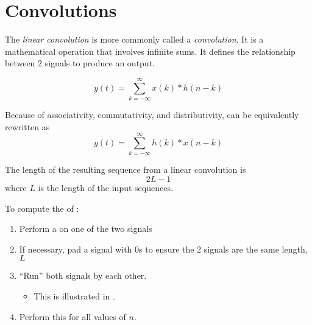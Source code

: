 \section{Convolutions}\label{sec:Convolutions}
\begin{definition}\label{def:Linear_Convolution}
  The \emph{linear convolution} is more commonly called a \emph{convolution}.
  It is a mathematical operation that involves infinite sums.
  It defines the relationship between 2 signals to produce an output.

  \begin{equation}\label{eq:Linear_Convolution-1}
    y(t) = \sum\limits_{k=-\infty}^{\infty} x(k) * h(n-k)
  \end{equation}

  Because of associativity, commutativity, and distributivity,  can be equivalently rewritten as
  \begin{equation}\label{eq:Linear_Convolution-2}
    y(t) = \sum\limits_{k=-\infty}^{\infty} h(k) * x(n-k)
  \end{equation}

  The length of the resulting sequence from a linear convolution is
  \begin{equation}\label{eq:Linear_Convolution_Length}
    2L-1
  \end{equation}
  where $L$ is the length of the input sequences.
\end{definition}

To compute the  of :
\begin{enumerate}[noitemsep]
\item Perform a  on one of the two signals
\item If necessary, pad a signal with 0s to ensure the 2 signals are the same length, $L$
\item ``Run'' both signals by each other.
  \begin{itemize}[noitemsep]
  \item This is illustrated in .
  \end{itemize}
\item Perform this for all values of $n$.
\end{enumerate}

